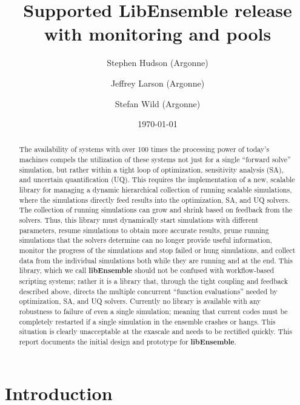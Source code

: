 \documentclass{ecpreport}
\title{Supported LibEnsemble release with monitoring and pools}
\author{Stephen Hudson (Argonne)
\and Jeffrey Larson (Argonne)
  \and  Stefan Wild (Argonne)
}
\date{\today}
\begin{document}
\frontmatter


\begin{abstract}
The availability of systems with over 100 times the processing power of today’s 
machines compels the utilization of these systems not just for a single ``forward
solve'' simulation, but rather within a tight loop of optimization, sensitivity 
analysis (SA), and uncertain quantification (UQ). This requires the implementation 
of a new, scalable library for managing a dynamic hierarchical collection of 
running scalable simulations, where the simulations directly feed results 
into the optimization, SA, and UQ solvers.  The collection of running simulations 
can grow and shrink based on feedback from the solvers. Thus, this library must 
dynamically start simulations with different parameters, resume simulations to 
obtain more accurate results, prune running simulations that the solvers determine 
can no longer provide useful information, monitor the progress of the simulations 
and stop failed or hung simulations, and collect data from the individual 
simulations both while they are running and at the end.  This library, which 
we call {\bf libEnsemble} should not be confused with workflow-based scripting 
systems; rather it is a library that, through the tight coupling and feedback 
described above, directs the multiple concurrent ``function evaluations'' 
needed by optimization, SA, and UQ solvers. Currently no library is available 
with any robustness to failure of even a single simulation; meaning that current 
codes must be completely restarted if a single simulation in the ensemble 
crashes or hangs. This situation is clearly unacceptable at the exascale
and needs to be rectified quickly.  This report documents the initial
design and prototype for {\bf libEnsemble}.
\end{abstract}


\mainmatter
\section{Introduction}
\end{document}
